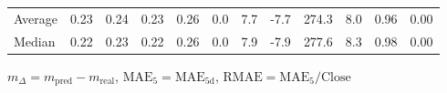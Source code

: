 \begin{threeparttable}
{\begin{tabular}{lrrrrrrrrrrr}
Average &          0.23 &          0.24 &          0.23 &        0.26 &                 0.0 &                 7.7 &       -7.7 &               274.3 &              8.0 &            0.96 &                   0.00 \\
 Median &          0.22 &          0.23 &          0.22 &        0.26 &                 0.0 &                 7.9 &       -7.9 &               277.6 &              8.3 &            0.98 &                   0.00 \\
\bottomrule
\end{tabular}
}
\begin{tablenotes}\footnotesize
\item $m_\Delta=m_{\text{pred}}-m_{\text{real}}$,
$\mathrm{MAE}_5=\mathrm{MAE}_{5\text{d}}$,
$\mathrm{RMAE}=\mathrm{MAE}_5/\text{Close}$
\end{tablenotes}
\end{threeparttable}
\endgroup

